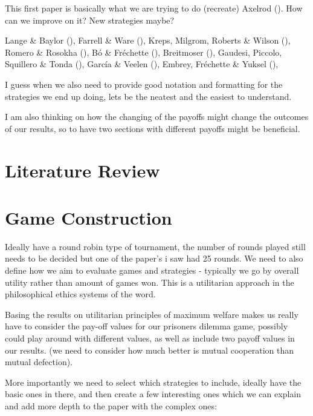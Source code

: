 \documentclass[11pt,preprint]{elsarticle}
\numberwithin{equation}{section}
\numberwithin{figure}{section}
\numberwithin{table}{section}
\begin{document}
This first paper is basically what we are trying to do (recreate)
Axelrod (). How can we improve
on it? New strategies maybe?

Lange \& Baylor (), Farrell \&
Ware (), Kreps, Milgrom,
Roberts \& Wilson (), Romero \&
Rosokha (), Bó \& Fréchette
(), Breitmoser
(), Gaudesi, Piccolo,
Squillero \& Tonda (), García
\& Veelen (), Embrey, Fréchette \&
Yuksel (),

I guess when we also need to provide good notation and formatting for
the strategies we end up doing, lets be the neatest and the easiest to
understand.

I am also thinking on how the changing of the payoffs might change the
outcomes of our results, so to have two sections with different payoffs
might be beneficial.

\section{\texorpdfstring{Literature
Review\label{litreview}}{Literature Review}}\label{literature-review}

\section{Game Construction}\label{game-construction}

Ideally have a round robin type of tournament, the number of rounds
played still needs to be decided but one of the paper's i saw had 25
rounds. We need to also define how we aim to evaluate games and
strategies - typically we go by overall utility rather than amount of
games won. This is a utilitarian approach in the philosophical ethics
systems of the word.

Basing the results on utilitarian principles of maximum welfare makes us
really have to consider the pay-off values for our prisoners dilemma
game, possibly could play around with different values, as well as
include two payoff values in our results. (we need to consider how much
better is mutual cooperation than mutual defection).

More importantly we need to select which strategies to include, ideally
have the basic ones in there, and then create a few interesting ones
which we can explain and add more depth to the paper with the complex
ones:
\end{document}
